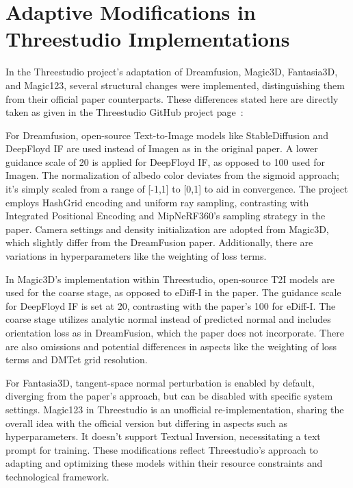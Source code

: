 \chapter{Adaptive Modifications in Threestudio Implementations}\label{ch:differences}

In the Threestudio project's adaptation of Dreamfusion, Magic3D, Fantasia3D, and Magic123, several structural changes were implemented, distinguishing them from their official paper counterparts. These differences stated here are directly taken as given in the Threestudio GitHub project page~\citep{threestudio2023}: 

For Dreamfusion, open-source Text-to-Image models like StableDiffusion and DeepFloyd IF are used instead of Imagen as in the original paper. A lower guidance scale of 20 is applied for DeepFloyd IF, as opposed to 100 used for Imagen. The normalization of albedo color deviates from the sigmoid approach; it's simply scaled from a range of [-1,1] to [0,1] to aid in convergence. The project employs HashGrid encoding and uniform ray sampling, contrasting with Integrated Positional Encoding and MipNeRF360's sampling strategy in the paper. Camera settings and density initialization are adopted from Magic3D, which slightly differ from the DreamFusion paper. Additionally, there are variations in hyperparameters like the weighting of loss terms.

In Magic3D's implementation within Threestudio, open-source T2I models are used for the coarse stage, as opposed to eDiff-I in the paper. The guidance scale for DeepFloyd IF is set at 20, contrasting with the paper's 100 for eDiff-I. The coarse stage utilizes analytic normal instead of predicted normal and includes orientation loss as in DreamFusion, which the paper does not incorporate. There are also omissions and potential differences in aspects like the weighting of loss terms and DMTet grid resolution.

For Fantasia3D, tangent-space normal perturbation is enabled by default, diverging from the paper's approach, but can be disabled with specific system settings. Magic123 in Threestudio is an unofficial re-implementation, sharing the overall idea with the official version but differing in aspects such as hyperparameters. It doesn't support Textual Inversion, necessitating a text prompt for training. These modifications reflect Threestudio's approach to adapting and optimizing these models within their resource constraints and technological framework.

